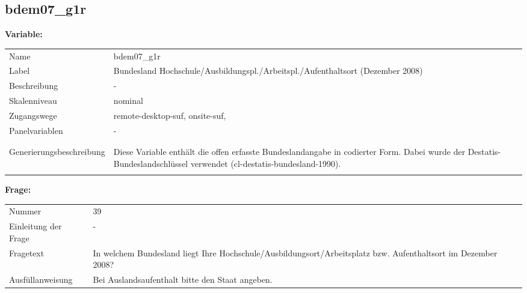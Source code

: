 	
	
	\subsection{bdem07\_g1r}
	\label{subSection:bdem07_g1r}

	\noindent\textbf{Variable:}\\
		\begin{tabular}{lL{11.3cm}}
			\label{tableVariable:bdem07_g1r}
			Name & bdem07\_g1r \\
			Label & Bundesland Hochschule/Ausbildungspl./Arbeitspl./Aufenthaltsort (Dezember 2008) \\
			Beschreibung & - \\
			Skalenniveau & nominal \\
			Zugangswege &
				remote-desktop-suf,
				onsite-suf,
 \\
			Panelvariablen & -
			 \\
			 \\
 \\
					Generierungsbeschreibung & Diese Variable enthält die offen erfasste Bundeslandangabe in codierter Form. Dabei wurde der Destatis-Bundeslandschlüssel verwendet (cl-destatis-bundesland-1990).
				 \\	
			 \\
		\end{tabular}

		\vspace*{1 cm}
		\noindent\textbf{Frage:}\\
		\begin{tabular}{lL{11.3cm}}
			\label{tableQuestion:bdem07_g1r}
			Nummer & 39 \\
			Einleitung der Frage & - \\
			Fragetext & In welchem Bundesland liegt Ihre Hochschule/Ausbildungsort/Arbeitsplatz bzw. Aufenthaltsort im Dezember 2008? \\
			Ausfüllanweisung & Bei Auslandsaufenthalt bitte den Staat angeben. \\
		\end{tabular}





